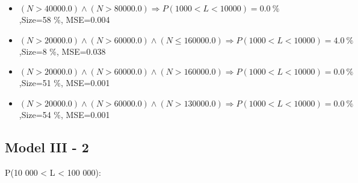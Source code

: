 \documentclass[numbered]{CSL}
\begin{document}
\begin{itemize}
\item $(N > 40000.0) \land (N > 80000.0) \Rightarrow P(1 000 < L < 10 000) = 0.0~\%$,\hfill Size=58 \%, MSE=0.004
\item $(N > 20000.0) \land (N > 60000.0) \land (N \leq 160000.0) \Rightarrow P(1 000 < L < 10 000) = 4.0~\%$,\hfill Size=8 \%, MSE=0.038
\item $(N > 20000.0) \land (N > 60000.0) \land (N > 160000.0) \Rightarrow P(1 000 < L < 10 000) = 0.0~\%$,\hfill Size=51 \%, MSE=0.001
\item $(N > 20000.0) \land (N > 60000.0) \land (N > 130000.0) \Rightarrow P(1 000 < L < 10 000) = 0.0~\%$,\hfill Size=54 \%, MSE=0.001
\end{itemize}

\subsection{Model III - 2}
P(10 000 < L < 100 000):
\end{document}
